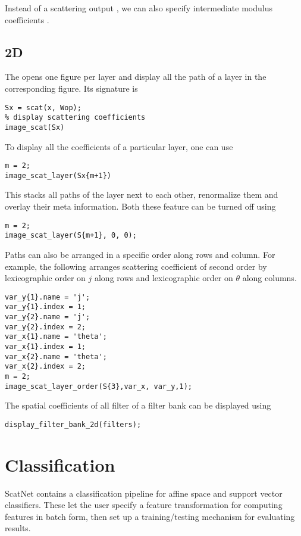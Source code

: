 \documentclass[twocolumn]{article}
\begin{document}
Instead of a scattering output , we can also specify intermediate modulus coefficients .

\subsection{2D}

The  opens one figure per layer and display all the path of a layer in the corresponding figure. Its signature is 
\begin{lstlisting}
Sx = scat(x, Wop);
% display scattering coefficients
image_scat(Sx)
\end{lstlisting}

To display all the coefficients of a particular layer, one can use 
\begin{lstlisting}
m = 2;
image_scat_layer(Sx{m+1})
\end{lstlisting}
This stacks all paths of the layer next to each other, renormalize them and overlay their meta information. Both these feature can be turned off using
\begin{lstlisting}
m = 2;
image_scat_layer(S{m+1}, 0, 0);
\end{lstlisting}
Paths can also be arranged in a specific order along rows and column.
For example, the following arranges scattering coefficient of second order
by lexicographic order on $j$ along rows and lexicographic order on $\theta$ along columns.
\begin{lstlisting}
var_y{1}.name = 'j';
var_y{1}.index = 1;
var_y{2}.name = 'j';
var_y{2}.index = 2;
var_x{1}.name = 'theta';
var_x{1}.index = 1;
var_x{2}.name = 'theta';
var_x{2}.index = 2;
m = 2;
image_scat_layer_order(S{3},var_x, var_y,1);
\end{lstlisting}
The spatial coefficients of all filter of a filter bank can be displayed using
\begin{lstlisting}
display_filter_bank_2d(filters);
\end{lstlisting}

\section{Classification}

ScatNet contains a classification pipeline for affine space and support vector classifiers. These let the user specify a feature transformation for computing features in batch form, then set up a training/testing mechanism for evaluating results.
\end{document}
